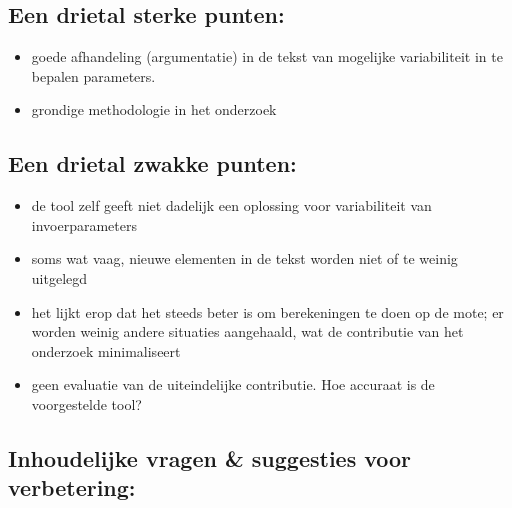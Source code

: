 \documentclass[11pt]{article}
\begin{document}
\subsection{Een drietal sterke punten:}
\begin{itemize}
\item goede afhandeling (argumentatie) in de tekst van mogelijke variabiliteit in te bepalen parameters.
\item grondige methodologie in het onderzoek
\end{itemize}

\subsection{Een drietal zwakke punten:}
\begin{itemize}
\item de tool zelf geeft niet dadelijk een oplossing voor variabiliteit van invoerparameters
\item soms wat vaag, nieuwe elementen in de tekst worden niet of te weinig uitgelegd
\item het lijkt erop dat het steeds beter is om berekeningen te doen op de mote; er worden weinig andere situaties aangehaald, wat de contributie van het onderzoek minimaliseert
\item geen evaluatie van de uiteindelijke contributie. Hoe accuraat is de voorgestelde tool?
\end{itemize}

\subsection{Inhoudelijke vragen \& suggesties voor verbetering:}
\end{document}
